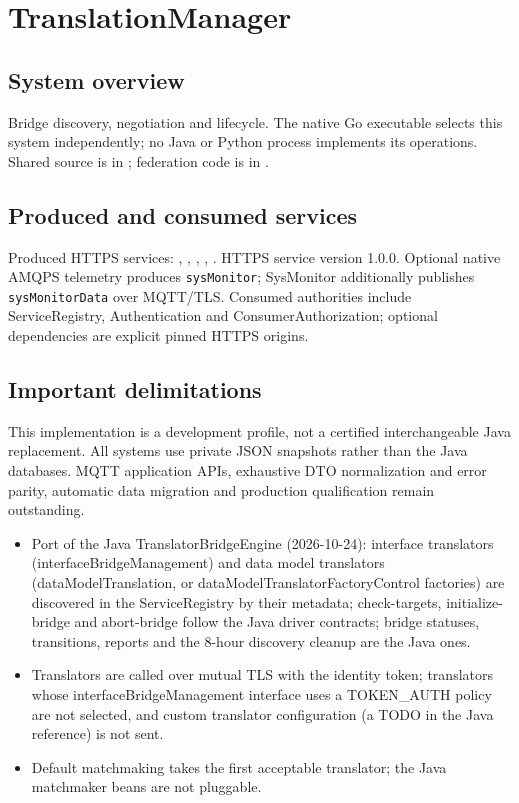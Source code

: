 \documentclass[a4paper]{arrowhead}
\begin{document}
\ArrowheadSetup
\section{TranslationManager}
\subsection{System overview}
Bridge discovery, negotiation and lifecycle. The native Go executable selects this system independently; no Java or Python process implements its operations. Shared source is in ; federation code is in .
\subsection{Produced and consumed services}
Produced HTTPS services: , \allowbreak {}, \allowbreak {}, \allowbreak {}, \allowbreak {}.
HTTPS service version 1.0.0. Optional native AMQPS telemetry produces \texttt{sysMonitor}; SysMonitor additionally publishes \texttt{sysMonitorData} over MQTT/TLS. Consumed authorities include ServiceRegistry, Authentication and ConsumerAuthorization; optional dependencies are explicit pinned HTTPS origins.
\subsection{Important delimitations}
This implementation is a development profile, not a certified interchangeable Java replacement. All systems use private JSON snapshots rather than the Java databases. MQTT application APIs, exhaustive DTO normalization and error parity, automatic data migration and production qualification remain outstanding.
\begin{itemize}
\item Port of the Java TranslatorBridgeEngine (2026-10-24): interface translators (interfaceBridgeManagement) and data model translators (dataModelTranslation, or dataModelTranslatorFactoryControl factories) are discovered in the ServiceRegistry by their metadata; check-targets, initialize-bridge and abort-bridge follow the Java driver contracts; bridge statuses, transitions, reports and the 8-hour discovery cleanup are the Java ones.
\item Translators are called over mutual TLS with the identity token; translators whose interfaceBridgeManagement interface uses a TOKEN\_AUTH policy are not selected, and custom translator configuration (a TODO in the Java reference) is not sent.
\item Default matchmaking takes the first acceptable translator; the Java matchmaker beans are not pluggable.
\end{itemize}
\end{document}
